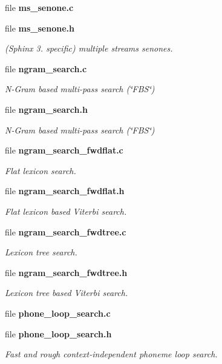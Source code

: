 \begin{DoxyCompactItemize}
file {\bfseries ms\-\_\-senone.\-c}
\item 
file {\bf ms\-\_\-senone.\-h}
\begin{DoxyCompactList}\small\item\em (Sphinx 3. specific) multiple streams senones. \end{DoxyCompactList}\item 
file {\bf ngram\-\_\-search.\-c}
\begin{DoxyCompactList}\small\item\em N-\/\-Gram based multi-\/pass search (\char`\"{}\-F\-B\-S\char`\"{}) \end{DoxyCompactList}\item 
file {\bf ngram\-\_\-search.\-h}
\begin{DoxyCompactList}\small\item\em N-\/\-Gram based multi-\/pass search (\char`\"{}\-F\-B\-S\char`\"{}) \end{DoxyCompactList}\item 
file {\bf ngram\-\_\-search\-\_\-fwdflat.\-c}
\begin{DoxyCompactList}\small\item\em Flat lexicon search. \end{DoxyCompactList}\item 
file {\bf ngram\-\_\-search\-\_\-fwdflat.\-h}
\begin{DoxyCompactList}\small\item\em Flat lexicon based Viterbi search. \end{DoxyCompactList}\item 
file {\bf ngram\-\_\-search\-\_\-fwdtree.\-c}
\begin{DoxyCompactList}\small\item\em Lexicon tree search. \end{DoxyCompactList}\item 
file {\bf ngram\-\_\-search\-\_\-fwdtree.\-h}
\begin{DoxyCompactList}\small\item\em Lexicon tree based Viterbi search. \end{DoxyCompactList}\item 
file {\bfseries phone\-\_\-loop\-\_\-search.\-c}
\item 
file {\bf phone\-\_\-loop\-\_\-search.\-h}
\begin{DoxyCompactList}\small\item\em Fast and rough context-\/independent phoneme loop search. \end{DoxyCompactList}\item 

\end{DoxyCompactItemize}
